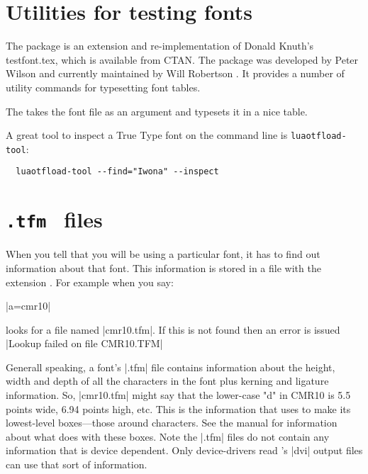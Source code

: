 \section{Utilities for testing fonts}

The package  is an extension and re-implementation of Donald Knuth’s testfont.tex, which
is available from CTAN. The package was developed by Peter Wilson and currently maintained by Will Robertson \citep{fonttable}. It provides a number of utility commands for typesetting font tables.

\begin{macro}{\fonttable}
The  takes the font file as an  argument and typesets it in a nice table. 
\end{macro}
 
\ifxetex
 \else
\fi

A great tool to inspect a True Type font on the command line is \texttt{luaotfload-tool}:

\begin{verbatim}
  luaotfload-tool --find="Iwona" --inspect
\end{verbatim}

\section{ \texttt{.tfm } files}


When you tell \tex that you will be using a particular font, it has to find out information about that font. This information is stored in a file with the extension . For example when you say:

|\font a=cmr10|

\noindent \tex looks for  a file named |cmr10.tfm|. If this is not found then an error is issued |Lookup failed on file CMR10.TFM|

Generall speaking, a font's |.tfm| file contains information about the height, width and depth of all the characters in the font plus kerning and ligature information. So, |cmr10.tfm| might say that the lower-case "d" in CMR10 is 5.5 points wide, 6.94 points high, etc. This is the information that \tex uses to make its lowest-level boxes---those around characters. See the \tex manual for information about what \tex does with these boxes. Note the |.tfm| files do not contain any information that is device dependent. Only device-drivers read \tex's |dvi| output files can use that sort of information.


